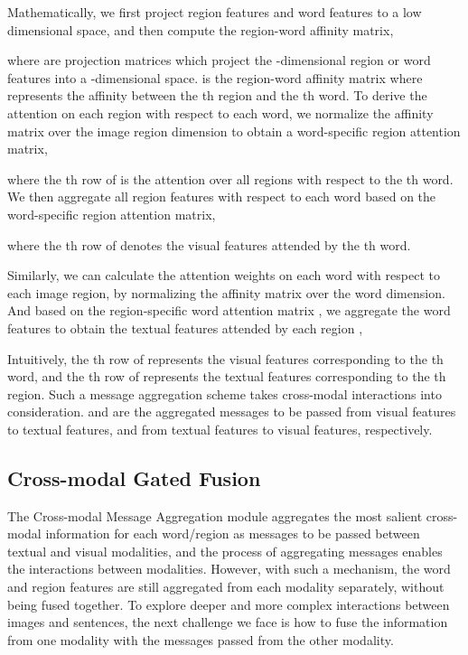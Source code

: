 \documentclass[10pt,twocolumn,letterpaper]{article}
\begin{document}
\setlength{\belowdisplayskip}{4pt}
\setlength{\belowdisplayshortskip}{4pt}
\setlength{\abovedisplayskip}{4pt}
\setlength{\abovedisplayshortskip}{4pt}

Mathematically, we first project region features and word features to a low dimensional space, and then compute the region-word affinity matrix,

where  are projection matrices which project the -dimensional region or word features into a -dimensional space. 
 is the region-word affinity matrix where  represents the affinity between the th region and the th word.
To derive the attention on each region with respect to each word, we normalize the affinity matrix over the image region dimension to obtain a word-specific region attention matrix,

where the th row of  is the attention over all regions with respect to the th word.
We then aggregate all region features with respect to each word based on the word-specific region attention matrix,

where the th row of  denotes the visual features attended by the th word.

Similarly, we can calculate the attention weights on each word with respect to each image region, by normalizing the affinity matrix  over the word dimension. 
And based on the region-specific word attention matrix , we aggregate the word features to obtain the textual features attended by each region ,


Intuitively, the th row of  represents the visual features corresponding to the th word, and the th row of  represents the textual features corresponding to the th region. Such a message aggregation scheme takes cross-modal interactions into consideration.  and  are the aggregated messages to be passed from visual features to textual features, and from textual features to visual features, respectively.










\subsection{Cross-modal Gated Fusion}
\label{subsec:gate_fusion}
The Cross-modal Message Aggregation module aggregates the most salient cross-modal information for each word/region as messages to be passed between textual and visual modalities, and the process of aggregating messages enables the interactions between modalities. 
However, with such a mechanism, the word and region features are still aggregated from each modality separately, without being fused together. 
To explore deeper and more complex interactions between images and sentences, the next challenge we face is how to fuse the information from one modality with the messages passed from the other modality. 
\end{document}
